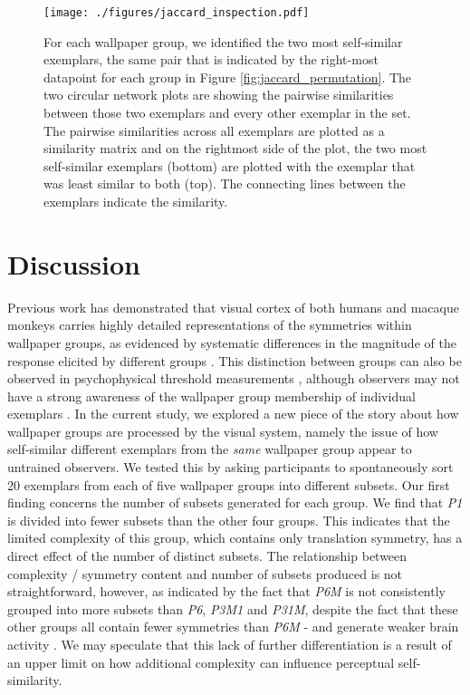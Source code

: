 \documentclass[11pt, twoside]{article}
\begin{document}
\begin{figure}[hbt!]
	\centering
	\texttt{[image: ./figures/jaccard\_inspection.pdf]}
	\caption{For each wallpaper group, we identified the two most self-similar exemplars, the same pair that is indicated by the right-most datapoint for each group in Figure \ref{fig:jaccard_permutation}. The two circular network plots are showing the pairwise similarities between those two exemplars and every other exemplar in the set. The pairwise similarities across all exemplars are plotted as a similarity matrix and on the rightmost side of the plot, the two most self-similar exemplars (bottom) are plotted with the exemplar that was least similar to both (top). The connecting lines between the exemplars indicate the similarity.}
	\label{fig:jaccard_inspection}
\end{figure}

\section*{Discussion}
Previous work has demonstrated that visual cortex of both humans and macaque monkeys carries highly detailed representations of the symmetries within wallpaper groups, as evidenced by systematic differences in the magnitude of the response elicited by different groups \citep{RN1725,kohler_clarke_2021,audurier_symmetry_2021}. This distinction between groups can also be observed in psychophysical threshold measurements \citep{kohler_clarke_2021}, although observers may not have a strong awareness of the wallpaper group membership of individual exemplars \citep{RN172}. In the current study, we explored a new piece of the story about how wallpaper groups are processed by the visual system, namely the issue of how self-similar different exemplars from the \textit{same} wallpaper group appear to untrained observers. We tested this by asking participants to spontaneously sort 20 exemplars from each of five wallpaper groups into different subsets. 
Our first finding concerns the number of subsets generated for each group. We find that \textit{P1} is divided into fewer subsets than the other four groups. This indicates that the limited complexity of this group, which contains only translation symmetry, has a direct effect of the number of distinct subsets. The relationship between complexity / symmetry content and number of subsets produced is not straightforward, however, as indicated by the fact that \textit{P6M} is not consistently grouped into more subsets than \textit{P6}, \textit{P3M1} and \textit{P31M}, despite the fact that these other groups all contain fewer symmetries than \textit{P6M} - and generate weaker brain activity \citep{kohler_clarke_2021}. We may speculate that this lack of further differentiation is a result of an upper limit on how additional complexity can influence perceptual self-similarity. 
\end{document}
